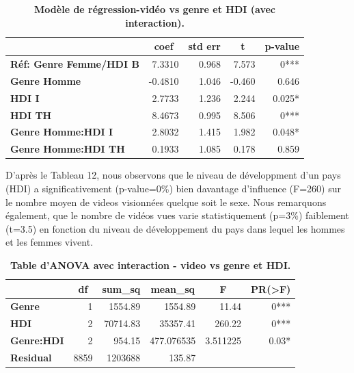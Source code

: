 \documentclass[12pt, a4paper, titlepage, table]{article}
\begin{document}
	\begin{table}[H]
		\centering
		\fontsize{12}{20}\selectfont
		\begin{tabular}{|l|r|r|r|r|}
			\hline
			\multicolumn{1}{|c|}{\textbf{}}&
			\multicolumn{1}{c|}{\textbf{coef}}&
			\multicolumn{1}{c|}{\textbf{std err}}&
			\multicolumn{1}{c|}{\textbf{t}}&
			\multicolumn{1}{c|}{\textbf{p-value}}\\	
			\hline
				\textbf{Réf: Genre Femme/HDI B}&			7.3310&			0.968&	7.573&	0***\\
				\textbf{Genre Homme}&	-0.4810&		1.046&	-0.460&	0.646\\	
				\textbf{HDI I}&	2.7733&			1.236&	2.244&	0.025*\\	
				\textbf{HDI TH}&	8.4673&			0.995&	8.506&	0***\\	
				\textbf{Genre Homme:HDI I}&	2.8032&	1.415&	1.982&	0.048*\\
				\textbf{Genre Homme:HDI TH}&	0.1933&	1.085&	0.178&	0.859\\
			\hline
		\end{tabular}
	\caption{\textbf{Modèle de régression-vidéo vs genre et HDI (avec interaction).}}
\end{table}
	
	D'après le Tableau 12, nous observons que le niveau de développment d'un pays (HDI) a significativement (p-value=0\%) bien davantage d'influence (F=260) sur le nombre moyen de videos 
	visionnées quelque soit le sexe. Nous remarquons également, que le nombre de vidéos vues varie statistiquement (p=3\%) faiblement (t=3.5) en fonction  
	du niveau de développement du pays dans lequel les hommes et les femmes vivent. 
	
	\begin{table}[H]
		\centering
		\fontsize{12}{20}\selectfont
		\begin{tabular}{|l|r|r|r|r|r|}
			\hline
			\multicolumn{1}{|c|}{\textbf{}}&
			\multicolumn{1}{c|}{\textbf{df}}&
			\multicolumn{1}{c|}{\textbf{sum\_sq}}&
			\multicolumn{1}{c|}{\textbf{mean\_sq}}&
			\multicolumn{1}{c|}{\textbf{F}}&
			\multicolumn{1}{c|}{\textbf{PR(>F)}}\\
			\hline
				\textbf{Genre}&	1&	1554.89&	1554.89&	11.44&	0***\\
				\textbf{HDI}&	2&	70714.83&	35357.41&	260.22&	0***\\
				\textbf{Genre:HDI}&2&	954.15&	477.076535&	3.511225&0.03*\\
				\textbf{Residual}&	8859&	1203688&	135.87&	&	\\
			\hline
		\end{tabular}
	\caption{\textbf{Table d'ANOVA avec interaction - video vs genre et HDI.}}
\end{table}
\end{document}

